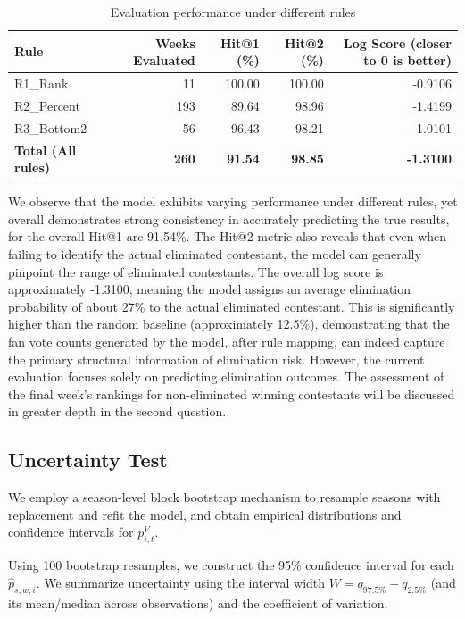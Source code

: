 \documentclass[12pt]{article}
\DeclareRobustCommand{\hat}[1]{\ensuremath{\widehat{#1}}}
\begin{document}
\begin{table}[H]
  \centering
  \caption{Evaluation performance under different rules}
  \label{tab:rule-performance}
  \renewcommand{\arraystretch}{1.15}
  \begin{tabular}{lrrrr}
    \toprule
    Rule & Weeks Evaluated & Hit@1 (\%) & Hit@2 (\%) & Log Score (closer to 0 is better) \\
    \midrule
    R1\_Rank    &  11 & 100.00 & 100.00 & -0.9106 \\
    R2\_Percent & 193 &  89.64 &  98.96 & -1.4199 \\
    R3\_Bottom2 &  56 &  96.43 &  98.21 & -1.0101 \\
    \midrule
    \textbf{Total (All rules)} & \textbf{260} & \textbf{91.54} & \textbf{98.85} & \textbf{-1.3100} \\
    \bottomrule
  \end{tabular}
\end{table}

We observe that the model exhibits varying performance under different rules, yet overall demonstrates strong consistency in accurately predicting the true results, for the overall Hit@1 are 91.54\%. The Hit@2 metric also reveals that even when failing to identify the actual eliminated contestant, the model can generally pinpoint the range of eliminated contestants. The overall log score is approximately -1.3100, meaning the model assigns an average elimination probability of about 27\% to the actual eliminated contestant. This is significantly higher than the random baseline (approximately 12.5\%), demonstrating that the fan vote counts generated by the model, after rule mapping, can indeed capture the primary structural information of elimination risk. However, the current evaluation focuses solely on predicting elimination outcomes. The assessment of the final week's rankings for non-eliminated winning contestants will be discussed in greater depth in the second question.

\subsection{Uncertainty Test}

We employ a season-level block bootstrap mechanism to resample seasons with replacement and refit the model, and obtain empirical distributions and confidence intervals for $p_{i,t}^V$.

Using 100 bootstrap resamples, we construct the 95\% confidence interval for each $\hat{p}_{s,w,i}$. We summarize uncertainty using the interval width $W = q_{97.5\%} - q_{2.5\%}$ (and its mean/median across observations) and the coefficient of variation.
\end{document}
